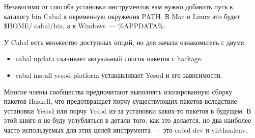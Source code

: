 Независимо от способа установки инструментов вам нужно добавить путь к каталогу bin Cabal в переменную окружения PATH. В Mac и Linux это будет \$HOME/.cabal/bin, а в Windows~--- \%APPDATA\%\cabal\bin.

У Cabal есть множество доступных опций, но для начала ознакомьтесь с двумя:

\begin{itemize}
  \item cabal updata скачивает актуальный список пакетов с hackage.
  \item cabal install yesod-platform устанавливает Yesod и его зависимости.
\end{itemize}

Многие члены сообщества предпочитают выполнять изолированную сборку пакетов Haskell, что предотвращает порчу существующих пакетов вследствие установки Yesod или порчу Yesod из-за установки каких-то пакетов в будущем. В этой книге я не буду углубляться в детали того, как это делается, но два наиболее часто используемых для этих целей инструмента~--- это cabal-dev и virthualenv.